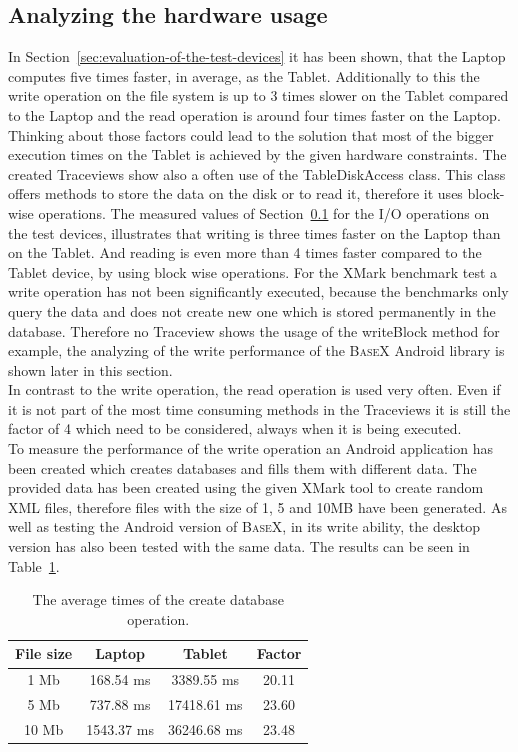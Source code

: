 \newpage
\subsection{Analyzing the hardware usage}
\label{sec:analyzing-the-hardware-usage}
In Section~\ref{sec:evaluation-of-the-test-devices} it has been shown, that the Laptop computes five times faster, in average, as the Tablet.
Additionally to this the write operation on the file system is up to 3 times slower on the Tablet compared to the Laptop and the read operation is around four times faster on the Laptop.
Thinking about those factors could lead to the solution that most of the bigger execution times on the Tablet is achieved by the given hardware constraints.
The created Traceviews show also a often use of the \textsf{TableDiskAccess} class.
This class offers methods to store the data on the disk or to read it, therefore it uses block-wise operations.
The measured values of Section~\ref{sec:analyzing-the-hardware-usage} for the I/O operations on the test devices, illustrates that writing is three times faster on the Laptop than on the Tablet.
And reading is even more than 4 times faster compared to the Tablet device, by using block wise operations.
For the XMark benchmark test a write operation has not been significantly executed, because the benchmarks only query the data and does not create new one which is stored permanently in the database.
Therefore no Traceview shows the usage of the \textsf{writeBlock} method for example, the analyzing of the write performance of the \textsc{BaseX} Android library is shown later in this section.\\
In contrast to the write operation, the read operation is used very often.
Even if it is not part of the most time consuming methods in the Traceviews it is still the factor of 4 which need to be considered, always when it is being executed.\\
To measure the performance of the write operation an Android application has been created which creates databases and fills them with different data.
The provided data has been created using the given XMark tool to create random XML files, therefore files with the size of 1, 5 and 10MB have been generated.
As well as testing the Android version of \textsc{BaseX}, in its write ability, the desktop version has also been tested with the same data.
The results can be seen in Table~\ref{tab:average-times-create-db}.
\begin{table}[htpb]
	\centering
	\begin{tabular}{|c|c|c||c|}
		\hline
		File size&Laptop&Tablet&Factor\\
		\hline
		1 Mb&168.54 ms&3389.55 ms&20.11\\
		\hline
		5 Mb&737.88 ms&17418.61 ms&23.60\\
		\hline
		10 Mb&1543.37 ms&36246.68 ms&23.48\\
		\hline
	\end{tabular}
	\caption{The average times of the create database operation.}
	\label{tab:average-times-create-db}
\end{table}

